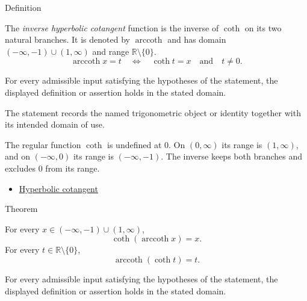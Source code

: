 

\begin{definitionbox}{Definition}
\begin{definition}
\label{def:inverse-hyperbolic-cotangent}
The \emph{inverse hyperbolic cotangent} function is the inverse of
$\operatorname{coth}$ on its two natural branches. It is denoted by
$\operatorname{arccoth}$ and has domain
$(-\infty,-1)\cup(1,\infty)$ and range $\mathbb{R}\setminus\{0\}$.
\[
  \operatorname{arccoth} x=t
  \quad\Longleftrightarrow\quad
  \operatorname{coth} t=x
  \quad\text{and}\quad
  t\neq 0.
\]
\end{definition}
\end{definitionbox}
\begin{remark*}
For every admissible input satisfying the hypotheses of the statement, the
displayed definition or assertion holds in the stated domain.
\end{remark*}

\begin{remark*}[Interpretation]
The statement records the named trigonometric object or identity together with
its intended domain of use.
\end{remark*}

\begin{remark*}
The regular function $\operatorname{coth}$ is undefined at $0$. On
$(0,\infty)$ its range is $(1,\infty)$, and on $(-\infty,0)$ its range is
$(-\infty,-1)$. The inverse keeps both branches and excludes $0$ from its
range.
\end{remark*}
\begin{dependencies}
\begin{itemize}
  \item \hyperref[def:hyperbolic-cotangent]{Hyperbolic cotangent}
\end{itemize}
\end{dependencies}

\begin{theorembox}{Theorem}
\begin{theorem}
\label{thm:inverse-hyperbolic-cotangent-identities}
For every $x\in(-\infty,-1)\cup(1,\infty)$,
\[
  \operatorname{coth}(\operatorname{arccoth} x)=x.
\]
For every $t\in\mathbb{R}\setminus\{0\}$,
\[
  \operatorname{arccoth}(\operatorname{coth} t)=t.
\]
\end{theorem}
\end{theorembox}
\begin{remark*}
For every admissible input satisfying the hypotheses of the statement, the
displayed definition or assertion holds in the stated domain.
\end{remark*}

